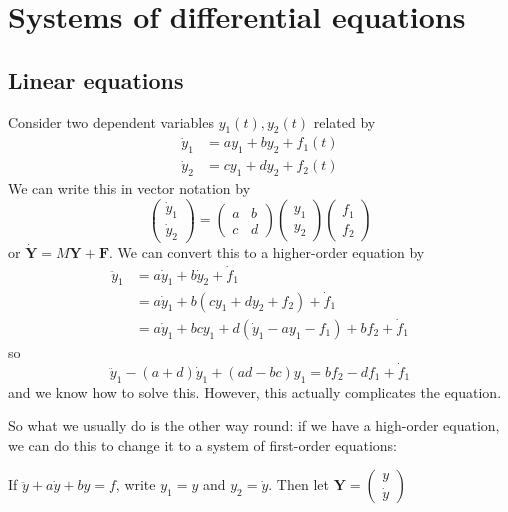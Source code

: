 \documentclass[a4paper]{article}
\begin{document}
\section{Systems of differential equations}
\subsection{Linear equations}
Consider two dependent variables $y_1(t), y_2(t)$ related by
\begin{align*}
  \dot y_1 &= ay_1 + by_2 + f_1(t)\\
  \dot y_2 &= cy_1 + dy_2 + f_2(t)
\end{align*}
We can write this in vector notation by
\[
  \begin{pmatrix}
    \dot y_1\\\dot y_2
  \end{pmatrix} =
  \begin{pmatrix}
    a & b\\
    c & d
  \end{pmatrix}
  \begin{pmatrix}
    y_1\\y_2
  \end{pmatrix}
  \begin{pmatrix}
    f_1\\f_2
  \end{pmatrix}
\]
or $\mathbf{\dot Y} = M\mathbf{Y} + \mathbf{F}$. We can convert this to a higher-order equation by
\begin{align*}
  \ddot y_1 &= a\dot y_1 + b\dot y_2 + \dot f_1\\
  &= a\dot y_1 + b(cy_1 + dy_2 + f_2) + \dot f_1\\
  &= a\dot y_1 + bcy_1 + d(\dot y_1 - ay_1 - f_1) + bf_2 + \dot f_1
\end{align*}
so
\[
  \ddot y_1 - (a + d)\dot y_1 + (ad - bc) y_1 = bf_2 - df_1 + \dot f_1
\]
and we know how to solve this. However, this actually complicates the equation.

So what we usually do is the other way round: if we have a high-order equation, we can do this to change it to a system of first-order equations:

If $\ddot y + a\dot y + by = f$, write $y_1 = y$ and $y_2 = \dot y$. Then let $\mathbf{Y} =
\begin{pmatrix}
  y\\\dot y
\end{pmatrix}$
\end{document}
